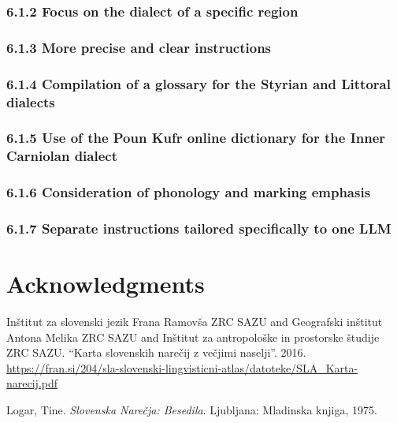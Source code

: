 \documentclass[fleqn,moreauthors,10pt]{ds_report}
\begin{document}
\subsubsection{6.1.2 Focus on the dialect of a specific region
}
\subsubsection{6.1.3 More precise and clear instructions
}
\subsubsection{6.1.4 Compilation of a glossary for the Styrian and Littoral dialects
}
\subsubsection{6.1.5 Use of the Poun Kufr online dictionary for the Inner Carniolan dialect
}
\subsubsection{6.1.6 Consideration of phonology and marking emphasis}

\subsubsection{6.1.7 Separate instructions tailored specifically to one LLM}


\section*{Acknowledgments}




    Inštitut za slovenski jezik Frana Ramovša ZRC SAZU and Geografski inštitut Antona Melika ZRC SAZU and Inštitut za antropološke in prostorske študije ZRC SAZU. “Karta slovenskih narečij z večjimi naselji”. 2016. \href{https://fran.si/204/sla-slovenski-lingvisticni-atlas/datoteke/SLA_Karta-narecij.pdf}{https://fran.si/204/sla-slovenski-lingvisticni-atlas/datoteke/SLA\_Karta-narecij.pdf}

    Logar, Tine. \textit{Slovenska Narečja: Besedila}. Ljubljana: Mladinska knjiga, 1975.
\end{document}
